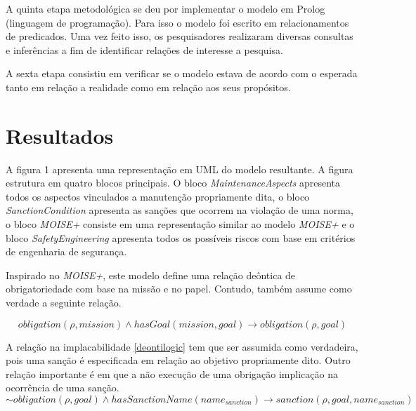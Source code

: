 \documentclass[a0,portrait]{a0poster}
\begin{document}
\begin{multicols}{2}
A quinta etapa metodológica se deu por implementar o modelo em Prolog (linguagem de programação). Para isso
o modelo foi escrito em relacionamentos de predicados. Uma vez feito isso, os pesquisadores realizaram diversas
consultas e inferências a fim de identificar relações de interesse a pesquisa. 

A sexta etapa consistiu em verificar se o modelo estava de acordo com o esperada tanto em relação a realidade 
como em relação aos seus propósitos.

\section*{Resultados}

A figura 1 apresenta uma representação em UML do modelo resultante. A figura estrutura em 
quatro blocos principais. O bloco \textit{MaintenanceAspects} apresenta todos os aspectos vinculados a manutenção 
propriamente dita, o bloco \textit{SanctionCondition} apresenta as sanções que ocorrem na violação de uma norma, o 
bloco \textit{MOISE+} consiste em uma representação similar ao modelo \textit{MOISE+} e o bloco \textit{SafetyEngineering}
apresenta todos os possíveis riscos com base em critérios de engenharia de segurança.


Inspirado no \textit{MOISE+}, este modelo define uma relação deôntica de obrigatoriedade com base na missão e no papel. 
Contudo, também assume como verdade a seguinte relação. 

\begin{equation}\label{deontilogic}
	obligation(\rho,mission)\wedge hasGoal(mission,goal) \to obligation(\rho,goal)
\end{equation}

A relação na implacabilidade \ref{deontilogic} tem que ser assumida como verdadeira, pois uma sanção é especificada em 
relação ao objetivo propriamente dito. Outro relação importante é \label{sanction} em que a não execução de uma obrigação
implicação na ocorrência de uma sanção.
\begin{equation}\label{sanction}
		  \sim obligation(\rho,goal) \wedge hasSanctionName(name_{sanction}) \to sanction(\rho,goal,name_{sanction})
\end{equation}


\end{multicols}
\end{document}
